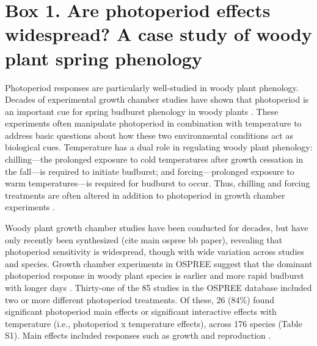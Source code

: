 \documentclass{article}
\begin{document}
\section*{Box 1. Are photoperiod effects widespread? A case study of woody plant spring phenology}
Photoperiod responses are particularly well-studied in woody plant phenology. Decades of experimental growth chamber studies have shown that photoperiod is an important cue for spring budburst phenology in woody plants \citep[e.g.,][]{Heide:1993a,Basler:2014aa,flynn2018}. These experiments often manipulate photoperiod in combination with temperature to address basic questions about how these two environmental conditions act as biological cues. Temperature has a dual role in regulating woody plant phenology: chilling---the prolonged exposure to cold temperatures after growth cessation in the fall---is required to initiate budburst; and forcing---prolonged exposure to warm temperatures---is required for budburst to occur. Thus, chilling and forcing treatments are often altered in addition to photoperiod in growth chamber experiments \citep[e.g.,][]{Campbell:1975aa,HEIDE:1977aa,Falusi:1990aa,Spann:2004aa,Laube:2014a}. %

\par Woody plant growth chamber studies have been conducted for decades, but have only recently been synthesized (cite main ospree bb paper), revealing that photoperiod sensitivity is widespread, though with wide variation across studies and species. Growth chamber experiments in OSPREE suggest that the dominant photoperiod response in woody plant species is earlier and more rapid budburst with longer days \citep [e.g., ][]{Caffarra:2011a}. Thirty-one of the 85 studies in the OSPREE database included two or more different photoperiod treatments. Of these, 26 (84\%) found significant photoperiod main effects or significant interactive effects with temperature (i.e., photoperiod x temperature effects), across 176 species (Table S1). Main effects included responses such as growth \citep[e.g., higher growth rates with longer days][]{Ashby:1962aa} and reproduction \citep[e.g., increased flowering with longer days][]{Heide:2012aa}. 
\end{document}
